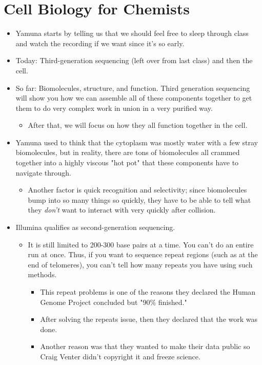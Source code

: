 \documentclass[../notes.tex]{subfiles}
\begin{document}
\section{Cell Biology for Chemists}
\begin{itemize}
    \item {}Yamuna starts by telling us that we should feel free to sleep through class and watch the recording if we want since it's so early.
    \item Today: Third-generation sequencing (left over from last class) and then the cell.
    \item So far: Biomolecules, structure, and function. Third generation sequencing will show you how we can assemble all of these components together to get them to do very complex work in union in a very purified way.
    \begin{itemize}
        \item After that, we will focus on how they all function together in the cell.
    \end{itemize}
    \item Yamuna used to think that the cytoplasm was mostly water with a few stray biomolecules, but in reality, there are tons of biomolecules all crammed together into a highly viscous "hot pot" that these components have to navigate through.
    \begin{itemize}
        \item Another factor is quick recognition and selectivity; since biomolecules bump into so many things so quickly, they have to be able to tell what they \emph{don't} want to interact with very quickly after collision.
    \end{itemize}
    \item Illumina qualifies as second-generation sequencing.
    \begin{itemize}
        \item It is still limited to 200-300 base pairs at a time. You can't do an entire run at once. Thus, if you want to sequence repeat regions (such as at the end of telomeres), you can't tell how many repeats you have using such methods.
        \begin{itemize}
            \item This repeat problems is one of the reasons they declared the Human Genome Project concluded but "90\% finished."
            \item After solving the repeats issue, then they declared that the work was done.
            \item Another reason was that they wanted to make their data public so Craig Venter didn't copyright it and freeze science.

\end{itemize}
\end{itemize}
\end{itemize}
\end{document}
